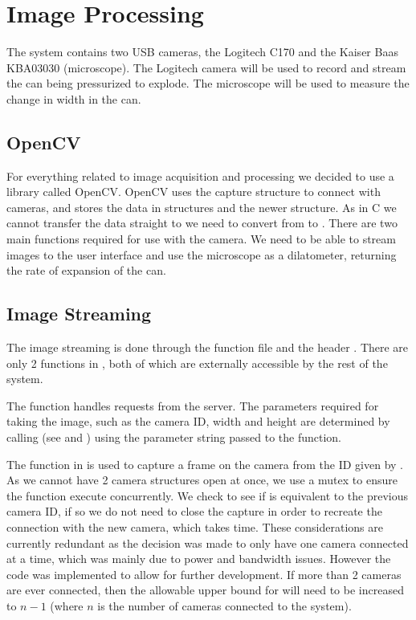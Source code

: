 \section{Image Processing}\label{Image Processing}




The system contains two USB cameras, the Logitech C170\cite{logitechC170} and the Kaiser Baas KBA03030 (microscope)\cite{kaiserbaasKBA03030}.  The Logitech camera will be used to record and stream the can being pressurized to explode.  The microscope will be used to measure the change in width in the can. 

\subsection{OpenCV}

For everything related to image acquisition and processing we decided to use a library called OpenCV\cite{OpenCV}. OpenCV uses the capture structure to connect with cameras, and stores the data in  structures and the newer  structure.  As in C we cannot transfer the data straight to  we need to convert from  to .  There are two main functions required for use with the camera.  We need to be able to stream images to the user interface and use the microscope as a dilatometer, returning the rate of expansion of the can.  


\subsection{Image Streaming}
The image streaming is done through the function file  and the header . There are only 2 functions in , both of which are externally accessible by the rest of the system.

 The  function handles requests from the server.  The parameters required for taking the image, such as the camera ID, width and height are determined by calling  (see  and ) using the parameter string passed to the function.

The function  in  is used to capture a frame on the camera from the ID given by .  As we cannot have 2 camera structures open at once, we use a mutex to ensure the function execute concurrently. We check to see if  is equivalent to the previous camera ID, if so we do not need to close the capture in order to recreate the connection with the new camera, which takes time.  These considerations are currently redundant as the decision was made to only have one camera connected at a time, which was mainly due to power and bandwidth issues.  However the code was implemented to allow for further development.  If more than 2 cameras are ever connected, then the allowable upper bound for  will need to be increased to $n-1$ (where $n$ is the number of cameras connected to the system).  

